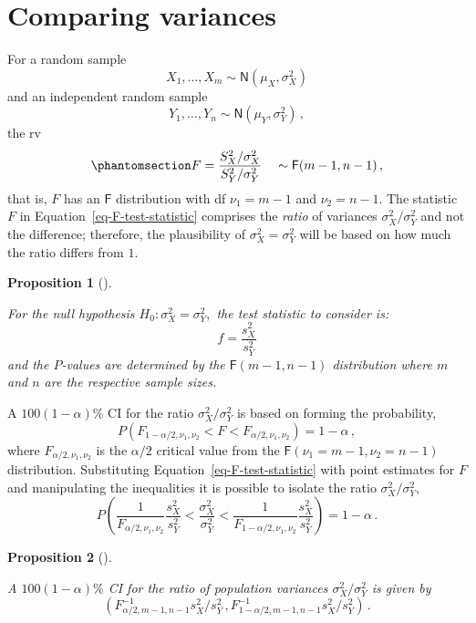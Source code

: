 \documentclass[
  a4paper,
  DIV=11,
  numbers=noendperiod,
  oneside]{scrreprt}
\theoremstyle{definition}
\theoremstyle{definition}
\theoremstyle{plain}
\newtheorem{proposition}{Proposition}[chapter]
\theoremstyle{plain}
\theoremstyle{definition}
\theoremstyle{remark}
\begin{document}
\section{Comparing variances}\label{sec-compare-variances}

For a random sample \[
X_1, \dots, X_m \sim \mathsf{N}(\mu_X, \sigma_X^2)
\] and an independent random sample \[
Y_1, \dots, Y_n \sim \mathsf{N}(\mu_Y, \sigma_Y^2)\,,
\] the rv \begin{equation}\phantomsection\label{eq-F-test-statistic}{
 F = \frac{S_X^2 / \sigma_X^2}{S_Y^2 / \sigma_Y^2} \quad \sim \mathsf{F}(m-1, n-1)\,,
}\end{equation} that is, \(F\) has an \(\mathsf{F}\) distribution with
df \(\nu_1 = m-1\) and \(\nu_2 = n-1.\) The statistic \(F\) in
Equation~\ref{eq-F-test-statistic} comprises the \emph{ratio} of
variances \(\sigma_X^2 / \sigma_Y^2\) and not the difference; therefore,
the plausibility of \(\sigma_X^2 = \sigma_Y^2\) will be based on how
much the ratio differs from \(1.\)

\begin{proposition}[]\protect\hypertarget{prp-htest-compare-variances}{}\label{prp-htest-compare-variances}

For the null hypothesis \(H_0 : \sigma_X^2 = \sigma_Y^2,\) the test
statistic to consider is: \[
f = \frac{s_X^2}{s_Y^2}
\] and the \(P\)-values are determined by the \(\mathsf{F}(m-1, n-1)\)
distribution where \(m\) and \(n\) are the respective sample sizes.

\end{proposition}

A \(100(1-\alpha)\%\) CI for the ratio \(\sigma_X^2 / \sigma_Y^2\) is
based on forming the probability, \[
 P(F_{1-\alpha/2, \nu_1, \nu_2} < F < F_{\alpha/2, \nu_1, \nu_2}) = 1 - \alpha\,,
\] where \(F_{\alpha/2, \nu_1, \nu_2}\) is the \(\alpha/2\) critical
value from the \(\mathsf{F}(\nu_1 = m-1, \nu_2 = n-1)\) distribution.
Substituting Equation~\ref{eq-F-test-statistic} with point estimates for
\(F\) and manipulating the inequalities it is possible to isolate the
ratio \(\sigma_X^2 / \sigma_Y^2,\) \[
 P \left( \frac{1}{F_{\alpha/2, \nu_1, \nu_2}} \frac{s_X^2}{s_Y^2} < \frac{\sigma_X^2}{\sigma_Y^2} < \frac{1}{F_{1-\alpha/2, \nu_1, \nu_2}} \frac{s_X^2}{s_Y^2} \right) 
 = 1 - \alpha \,.
\]

\begin{proposition}[]\protect\hypertarget{prp-ci-compre-variances}{}\label{prp-ci-compre-variances}

A \(100(1-\alpha)\%\) CI for the ratio of population variances
\(\sigma_X^2 / \sigma_Y^2\) is given by \[
 \left(F_{\alpha/2, m-1, n-1}^{-1} s_X^2 / s_Y^2 \,,  F_{1-\alpha/2, m-1, n-1}^{-1} s_X^2 / s_Y^2 \right)\,.
\]

\end{proposition}
\end{document}
